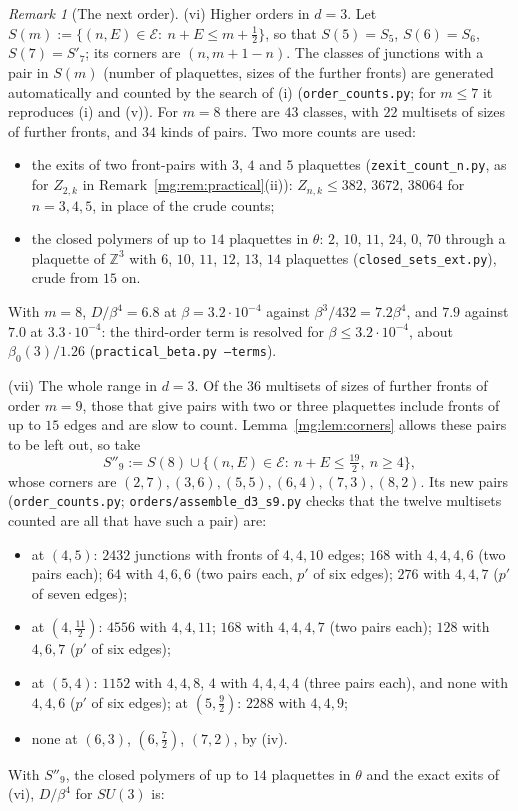 \documentclass[11pt,a4paper]{article}
\theoremstyle{definition}
\theoremstyle{remark}
\newtheorem{remark}[theorem]{Remark}
\newcommand{\Z}{\mathbb{Z}}
\begin{document}
\begin{remark}[The next order]
(vi) Higher orders in $d=3$. Let $S(m):=\{(n,E)\in\mathcal E:\ n+E\le m+\frac12\}$, so that $S(5)=S_5$, $S(6)=S_6$, $S(7)=S'_7$; its corners are $(n,m+1-n)$. The classes of
junctions with a pair in $S(m)$ (number of plaquettes, sizes of the further fronts) are generated automatically and counted by the search of (i)
(\texttt{order\_counts.py}; for $m\le7$ it reproduces (i) and (v)). For $m=8$ there are $43$ classes, with $22$ multisets of sizes of further fronts, and $34$ kinds of pairs. Two more counts are used:
\begin{itemize}
\item the exits of two front-pairs with $3$, $4$ and $5$ plaquettes (\texttt{zexit\_count\_n.py}, as for $Z_{2,k}$ in Remark~\ref{mg:rem:practical}(ii)): $Z_{n,k}\le382$, $3672$,
$38064$ for $n=3,4,5$, in place of the crude counts;
\item the closed polymers of up to $14$ plaquettes in $\theta$: $2$, $10$, $11$, $24$, $0$, $70$ through a plaquette of $\Z^3$ with $6$, $10$, $11$, $12$, $13$, $14$ plaquettes
(\texttt{closed\_sets\_ext.py}), crude from $15$ on.
\end{itemize}
With $m=8$, $D/\beta^4=6.8$ at $\beta=3.2\cdot10^{-4}$ against $\beta^3/432=7.2\beta^4$, and $7.9$ against $7.0$ at $3.3\cdot10^{-4}$: the third-order term is resolved for
$\beta\le3.2\cdot10^{-4}$, about $\beta_0(3)/1.26$ (\texttt{practical\_beta.py --terms}).

(vii) The whole range in $d=3$. Of the $36$ multisets of sizes of further fronts of order $m=9$, those that give pairs with two or three plaquettes include fronts of up to $15$
edges and are slow to count.
Lemma~\ref{mg:lem:corners} allows these pairs to be left out, so take
\[
S''_9:=S(8)\cup\bigl\{(n,E)\in\mathcal E:\ n+E\le\tfrac{19}2,\ n\ge4\bigr\},
\]
whose corners are $(2,7),(3,6),(5,5),(6,4),(7,3),(8,2)$. Its new pairs (\texttt{order\_counts.py}; \texttt{orders/assemble\_d3\_s9.py} checks that the twelve multisets counted are all that have such a pair) are:
\begin{itemize}
\item at $(4,5)$: $2432$ junctions with fronts of $4,4,10$ edges; $168$ with $4,4,4,6$ (two pairs each); $64$ with $4,6,6$ (two pairs each, $p'$ of six edges); $276$ with $4,4,7$ ($p'$ of seven edges);
\item at $(4,\frac{11}2)$: $4556$ with $4,4,11$; $168$ with $4,4,4,7$ (two pairs each); $128$ with $4,6,7$ ($p'$ of six edges);
\item at $(5,4)$: $1152$ with $4,4,8$, $4$ with $4,4,4,4$ (three pairs each), and none with $4,4,6$ ($p'$ of six edges); at $(5,\frac92)$: $2288$ with $4,4,9$;
\item none at $(6,3)$, $(6,\frac72)$, $(7,2)$, by (iv).
\end{itemize}
With $S''_9$, the closed polymers of up to $14$ plaquettes in $\theta$ and the exact exits of (vi), $D/\beta^4$ for $SU(3)$ is:


\end{remark}
\end{document}
